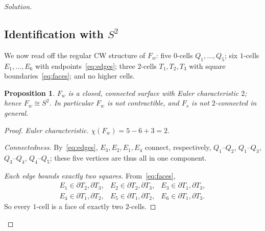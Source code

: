 \documentclass{amsart}
\newtheorem{proposition}{Proposition}
\theoremstyle{definition}
\newcommand{\bdy}{\partial}
\begin{document}
\begin{proof}[Solution]
\subsection{Identification with \texorpdfstring{$S^2$}{S2}}\label{sec:sphere}

We now read off the regular CW structure of $F_w$: five $0$-cells $Q_1,\dots,Q_5$; six
$1$-cells $E_1,\dots,E_6$ with endpoints~\eqref{eq:edges}; three $2$-cells $T_1,T_2,T_3$ with
square boundaries~\eqref{eq:faces}; and no higher cells.

\begin{proposition}\label{prop:s2}
$F_w$ is a closed, connected surface with Euler characteristic $2$; hence $F_w\cong S^2$. In
particular $F_w$ is not contractible, and $F_s$ is not $2$-connected in general.
\end{proposition}

\begin{proof}
\emph{Euler characteristic.} $\chi(F_w)=5-6+3=2$.

\emph{Connectedness.} By~\eqref{eq:edges}, $E_3,E_2,E_1,E_4$ connect, respectively, $Q_1$--$Q_2$,
$Q_1$--$Q_3$, $Q_3$--$Q_4$, $Q_4$--$Q_5$; these five vertices are thus all in one component.

\emph{Each edge bounds exactly two squares.} From~\eqref{eq:faces},
\[
\begin{array}{lll}
E_1\in\bdy T_2,\bdy T_3, & E_2\in\bdy T_2,\bdy T_3, & E_3\in\bdy T_1,\bdy T_3,\\
E_4\in\bdy T_1,\bdy T_2, & E_5\in\bdy T_1,\bdy T_2, & E_6\in\bdy T_1,\bdy T_3.
\end{array}
\]
So every $1$-cell is a face of exactly two $2$-cells.


\end{proof}
\end{proof}
\end{document}

